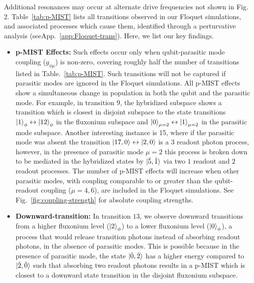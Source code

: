\documentclass[%
reprint,
superscriptaddress,
 amsmath,amssymb,
 aps,
 prx,
longbibliography,
floatfix,
]{revtex4-2}
\begin{document}

Additional resonances may occur at alternate drive frequencies not shown in Fig. 2. Table~\ref{tab:p-MIST} lists all transitions observed  in our Floquet simulations, and associated processes which cause them, identified through a perturvative analysis (seeApp.~\ref{app:Floquet-trans}). Here, we list our key findings.
\begin{itemize}
\item \textbf{p-MIST Effects:} Such effects occur only when qubit-parasitic mode coupling ($g_{\phi\mu}$) is non-zero, covering roughly half the number of transitions listed in Table.~\ref{tab:p-MIST}. Such transitions will not be captured if parasitic modes are ignored in the Floquet simulations. All p-MIST effects show a simultaneous change in population in both the qubit and the parasitic mode. For example, in transition $9$, the hybridized subspace shows a transition which is closest in disjoint subspace to the state transitions $\ket{1}_\phi \leftrightarrow\ket{12}_\phi$ in the fluxonium subspace and $\ket{0}_{\mu=2} \leftrightarrow\ket{1}_{\mu=2}$ in the parasitic mode subspace. Another interesting instance is 15, where if the parasitic mode was absent the transition $\ket{17,0}\leftrightarrow \ket{2,0}$ is a $3$ readout photon process, however, in the presence of parasitic mode $\mu=2$ this process is broken down to be mediated in the hybridized states by $\ket{\tilde{5},\tilde{1}}$ via two $1$ readout and $2$ readout processes. The number of p-MIST effects will increase when other parasitic modes, with coupling comparable to or greater than the qubit-readout coupling ($\mu = 4, 6$), are included in the Floquet simulations. See Fig.~\ref{fig:coupling-strength} for absolute coupling strengths. 

\item\textbf{Downward-transition:} In transition $13$, we observe downward transitions from a higher fluxonium level ($\ket{2}_\phi$) to a lower fluxonium level ($\ket{0}_\phi$), a process that would release transition photons instead of absorbing readout photons, in the absence of parasitic modes. This is possible because in the presence of parasitic mode, the state $\ket{\tilde{0},\tilde{2}}$ has a higher energy compared to $\ket{\tilde{2},\tilde{0}}$ such that absorbing two readout photons results in a p-MIST which is closest to a downward state transition in the disjoint fluxonium subspace. 


\end{itemize}
\end{document}
